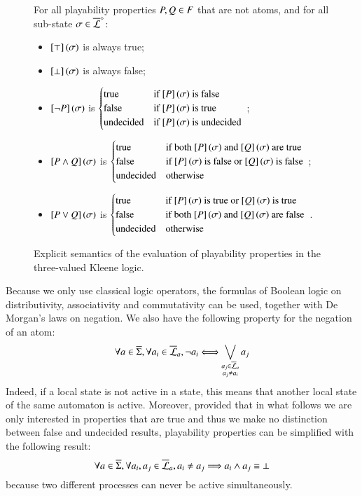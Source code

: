 \begin{figure}[ht]
  For all playability properties $P, Q \in F$ that are not atoms,
  and for all sub-state $\sigma \in \overline{\mathcal{L}}^{\diamond}$:
  \begin{itemize}
    \item $\left[\top\right](\sigma)$ is always true;
    \item $\left[\bot\right](\sigma)$ is always false;
    \item $\left[\neg P\right](\sigma)$ is
      $\begin{cases}
        \text{true} & \text{if $\left[P\right](\sigma)$ is false} \\
        \text{false} & \text{if $\left[P\right](\sigma)$ is true} \\
        \text{undecided} & \text{if $\left[P\right](\sigma)$ is undecided}
      \end{cases}$ \enspace;
    \item $\left[P \wedge Q\right](\sigma)$ is
      $\begin{cases}
        \text{true} & \text{if both $\left[P\right](\sigma)$ and $\left[Q\right](\sigma)$ are true} \\
        \text{false} & \text{if $\left[P\right](\sigma)$ is false or $\left[Q\right](\sigma)$ is false} \\
        \text{undecided} & \text{otherwise}
      \end{cases}$ \enspace;
    \item $\left[P \vee Q\right](\sigma)$ is
      $\begin{cases}
        \text{true} & \text{if $\left[P\right](\sigma)$ is true or $\left[Q\right](\sigma)$ is true} \\
        \text{false} & \text{if both $\left[P\right](\sigma)$ and $\left[Q\right](\sigma)$ are false} \\
        \text{undecided} & \text{otherwise}
      \end{cases}$ \enspace.
  \end{itemize}
  \caption{\label{fig:kleene}%
    Explicit semantics of the evaluation of playability properties in the
    three-valued Kleene logic.
  }
\end{figure}



Because we only use classical logic operators, the formulas of Boolean logic on
distributivity, associativity and commutativity can be used, together with De Morgan's laws on negation.
We also have the following property for the negation of an atom:
\[\forall a \in \overline{\Sigma}, \forall a_i \in \overline{\mathcal{L}}_a,
  \neg a_i \Longleftrightarrow \bigvee_{\substack{a_j \in \overline{\mathcal{L}}_a\\a_j \neq a_i}} a_j\]
Indeed, if a local state is not active in a state, this means that another local state of the same automaton is active.
Moreover,
provided that in what follows we are only interested in properties that are true
and thus we make no distinction between false and undecided results,
playability properties can be simplified with the following result:
\[\forall a \in \overline{\Sigma}, \forall a_i, a_j \in \overline{\mathcal{L}}_a,
  a_i \neq a_j \Longrightarrow a_i \wedge a_j \equiv \bot \]
because two different processes can never be active simultaneously.

